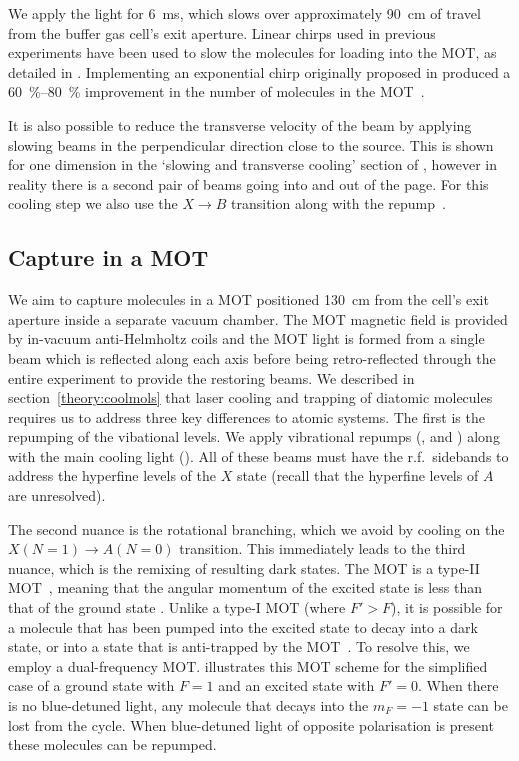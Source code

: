 We apply the light for \SI{6}{\milli\second}, which slows over approximately
\SI{90}{\centi\meter} of travel from the buffer gas cell's exit aperture.
Linear chirps used in previous experiments have been used to slow the molecules
for loading into the MOT, as detailed in . Implementing an
exponential chirp originally proposed in   produced a
\SIrange{60}{80}{\percent} improvement in the number of molecules in the
MOT~\cite{Jurgilas2021}.

It is also possible to reduce the transverse velocity of the beam by applying
slowing beams in the perpendicular direction close to the source. This is shown
for one dimension in the `slowing and transverse cooling' section of
, however in reality there is a second pair
of beams going into and out of the page. For this cooling step we also use the
$X\rightarrow B$ transition along with the 
repump~\cite{Jurgilas2021}.

\subsection{Capture in a MOT}
\label{overview:MOT}

We aim to capture molecules in a MOT positioned \SI{130}{\centi\meter} from the
cell's exit aperture inside a separate vacuum chamber. The MOT magnetic field
is provided by in-vacuum anti-Helmholtz coils and the MOT light is formed from
a single beam which is reflected along each axis before being retro-reflected
through the entire experiment to provide the restoring beams.
%
We described in section~\ref{theory:coolmols} that laser cooling and trapping of diatomic
molecules requires us to address three key differences to atomic systems. The
first is the repumping of the vibational levels. We apply vibrational repumps (, 
and ) along with the main cooling light ().  All of these beams must have the r.f.\ sidebands
to address the hyperfine levels of the $X$ state (recall that the hyperfine
levels of $A$ are unresolved).

The second nuance is the rotational branching, which we avoid by cooling on the
$X(N=1) \rightarrow A(N=0)$ transition. This immediately leads to the third
nuance, which is the remixing of resulting dark states. 
%
The \CaF{} MOT is a type-II MOT~\cite{1367-2630-18-12-123017}, meaning that the
angular momentum of the excited state  is less than that of the ground state .
Unlike a type-I MOT (where $F'>F$), it is possible for a molecule that has been
pumped into the excited state to decay into a dark state, or into a state that
is anti-trapped by the MOT~\cite{Fitch2021}.
%
To resolve this, we employ a dual-frequency MOT.
 illustrates this MOT scheme for the
simplified case of a ground state with $F=1$ and an excited state with $F'=0$.
%
When there is no blue-detuned light, any molecule that decays into the $m_F=-1$
state can be lost from the cycle. When blue-detuned light of opposite
polarisation is present these molecules can be repumped. 

